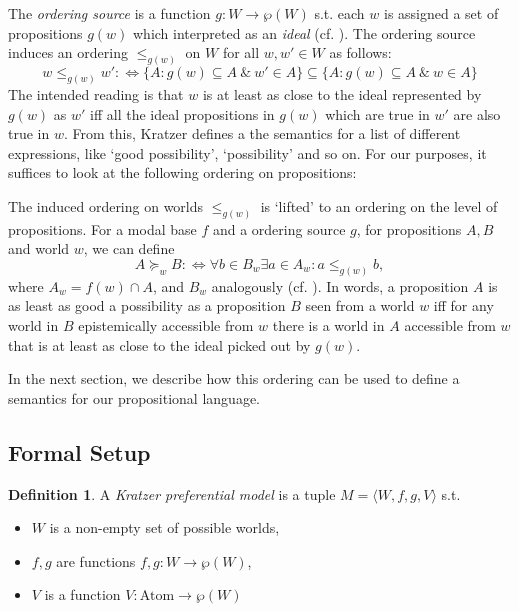 \documentclass{article}
\theoremstyle{definition}
\newtheorem{definition}{Definition}
\newcommand\todo[1]{\textcolor{red}{#1}}
\begin{document}
The \emph{ordering source} is a function $g: W \rightarrow \wp(W)$ s.t. each $w$ is assigned a set of propositions $g(w)$ which interpreted as an \emph{ideal} (cf. \cite{lewis81_order_seman_premis_seman_count}). The ordering source induces an ordering $\leq_{g(w)}$ on $W$ for all $w,w' \in W$ as follows:
\begin{equation}
    \label{eq:porder}
w \leq_{g(w)} w' :\iff \{A: g(w) \subseteq A ~\&~ w' \in A\} \subseteq \{A: g(w) \subseteq A ~\&~ w \in A\}
\end{equation}
The intended reading is that $w$ is at least as close to the ideal represented by $g(w)$ as $w'$ iff all the ideal propositions in $g(w)$ which are true in $w'$ are also true in $w$.
From this, Kratzer defines a the semantics for a list of different expressions, like `good possibility', `possibility' and so on.
For our purposes, it suffices to look at the following ordering on propositions:

The induced ordering on worlds $\leq_{g(w)}$ is `lifted' to an ordering on the level of propositions.
For a modal base $f$ and a ordering source $g$, for propositions $A,B$ and world $w$, we can define
\begin{equation}
    \label{eq:lifted}
    A \succeq_w B :\iff \forall b \in B_w \exists a \in A_w: a \leq_{g(w)} b,
\end{equation}
where $A_w = f(w) \cap A$, and $B_w$ analogously (cf. \cite[][p.~519]{holliday13_measur}).
In words, a proposition $A$ is as least as good a possibility as a proposition $B$ seen from a world $w$ iff for any world in $B$ epistemically accessible from $w$ there is a world in $A$ accessible from $w$ that is at least as close to the ideal picked out by $g(w)$.

In the next section, we describe how this ordering can be used to define a semantics for our propositional language.

\subsection{Formal Setup}

\begin{definition}
    A \emph{Kratzer preferential model} is a tuple $M = \langle W,f,g,V \rangle$ s.t.
    \begin{itemize}[nosep]
\renewcommand\labelitemi{--}
      \item $W$ is a non-empty set of possible worlds,
      \item $f,g$ are functions $f,g: W \rightarrow \wp(W)$,
      \item $V$ is a function $V: \text{Atom} \rightarrow \wp(W)$
    \end{itemize}
\end{definition}
\end{document}

